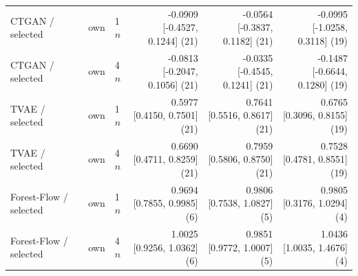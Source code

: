 \begin{tabular}{lllrrr}
CTGAN / selected & own & 1$n$ & \shortstack{-0.0909 \\ {[-0.4527, 0.1244] (21)}} & \shortstack{-0.0564 \\ {[-0.3837, 0.1182] (21)}} & \shortstack{-0.0995 \\ {[-1.0258, 0.3118] (19)}} \\
CTGAN / selected & own & 4$n$ & \shortstack{-0.0813 \\ {[-0.2047, 0.1056] (21)}} & \shortstack{-0.0335 \\ {[-0.4545, 0.1241] (21)}} & \shortstack{-0.1487 \\ {[-0.6644, 0.1280] (19)}} \\
TVAE / selected & own & 1$n$ & \shortstack{0.5977 \\ {[0.4150, 0.7501] (21)}} & \shortstack{0.7641 \\ {[0.5516, 0.8617] (21)}} & \shortstack{0.6765 \\ {[0.3096, 0.8155] (19)}} \\
TVAE / selected & own & 4$n$ & \shortstack{0.6690 \\ {[0.4711, 0.8259] (21)}} & \shortstack{0.7959 \\ {[0.5806, 0.8750] (21)}} & \shortstack{0.7528 \\ {[0.4781, 0.8551] (19)}} \\
Forest-Flow / selected & own & 1$n$ & \shortstack{0.9694 \\ {[0.7855, 0.9985] (6)}} & \shortstack{0.9806 \\ {[0.7538, 1.0827] (5)}} & \shortstack{0.9805 \\ {[0.3176, 1.0294] (4)}} \\
Forest-Flow / selected & own & 4$n$ & \shortstack{1.0025 \\ {[0.9256, 1.0362] (6)}} & \shortstack{0.9851 \\ {[0.9772, 1.0007] (5)}} & \shortstack{1.0436 \\ {[1.0035, 1.4676] (4)}} \\
\bottomrule
\end{tabular}
